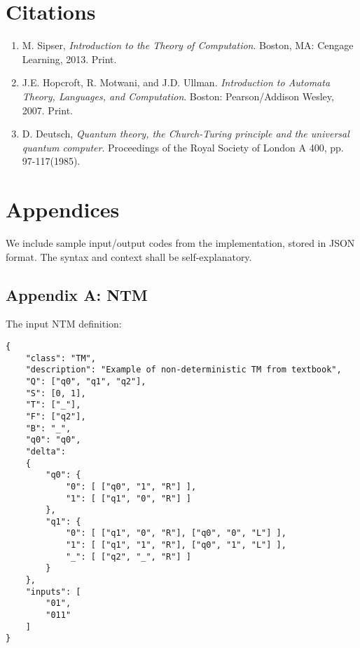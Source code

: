 \documentclass[12pt]{article}  %
\begin{document}
\section{Citations}

\begin{enumerate}
\item M. Sipser, \emph{Introduction to the Theory of Computation}. Boston, MA: Cengage Learning, 2013. Print.

\item J.E. Hopcroft, R. Motwani, and J.D. Ullman. \emph{Introduction to Automata Theory, Languages, and Computation}. Boston: Pearson/Addison Wesley, 2007. Print.

\item D. Deutsch, \emph{Quantum theory, the Church-Turing principle and the universal quantum computer}. Proceedings of the Royal Society of London A 400, pp. 97-117(1985). \label{quantum}
\end{enumerate}





\section{Appendices}
We include sample input/output codes from the implementation, stored in JSON format. The syntax and context shall be self-explanatory.

\subsection{Appendix A: NTM}

The input NTM definition:
\begin{verbatim}
{
    "class": "TM",
    "description": "Example of non-deterministic TM from textbook",
    "Q": ["q0", "q1", "q2"],
    "S": [0, 1],
    "T": ["_"],
    "F": ["q2"],
    "B": "_",
    "q0": "q0",
    "delta":
    {
        "q0": {
            "0": [ ["q0", "1", "R"] ],
            "1": [ ["q1", "0", "R"] ]
        },
        "q1": {
            "0": [ ["q1", "0", "R"], ["q0", "0", "L"] ],
            "1": [ ["q1", "1", "R"], ["q0", "1", "L"] ],
            "_": [ ["q2", "_", "R"] ]
        }
    },
    "inputs": [
        "01",
        "011"
    ]
}
\end{verbatim}
\end{document}
